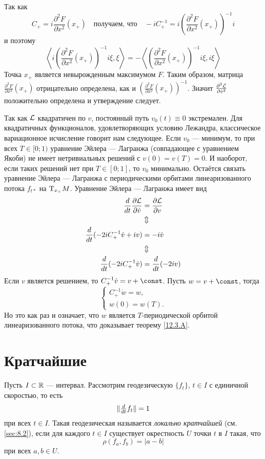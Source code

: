 Так как 
\[C_+=i\frac{\partial^2F}{\partial x^2}(x_+)
\quad\text{получаем, что}\quad
-iC_+^{-1}=i\left(\frac{\partial^2F}{\partial x^2}(x_+)\right)^{-1}i\]
и поэтому 
\[
\left\langle i\left(\frac{\partial^2F}{\partial x^2}(x_+)\right)^{-1}i\xi,\xi\right\rangle
=
-\left\langle \left(\frac{\partial^2F}{\partial x^2}(x_+)\right)^{-1}i\xi,i\xi\right\rangle
\]
Точка $x_+$ является невырожденным максимумом $F$.
Таким образом, матрица $\frac{\partial^2F}{\partial x^2}(x_+)$
отрицательно определена, как и $\left(\frac{\partial^2F}{\partial x^2}(x_+)\right)^{-1}$.
Значит $\tfrac{\partial^2\mathcal{L}}{\partial\dot v^2}$ положительно определена и утверждение следует.

Так как $\mathcal{L}$ квадратичен по $v$, постоянный путь $v_0(t) \equiv 0$ экстремален.
Для квадратичных функционалов, удовлетворяющих условию Лежандра, классическое вариационное исчисление говорит нам следующее.
Если $v_0$ — минимум, то при всех $T \in [0;1)$ уравнение Эйлера — Лагранжа (совпадающее с уравнением Якоби) не имеет нетривиальных решений с $v(0) = v(T) = 0$.
И наоборот, если таких решений нет при $T\in[0;1]$, то $v_0$ минимально.
Остаётся связать уравнение Эйлера — Лагранжа с периодическими орбитами линеаризованного потока $f_{t*}$ на $\mathrm{T}_{x_+}M$.
Уравнение Эйлера — Лагранжа имеет вид
\begin{align*}
\frac{d}{d t}\frac{\partial \mathcal{L}}{\partial \dot v}
&=\frac{\partial \mathcal{L}}{\partial v}
\\
&\Updownarrow
\\
\frac{d}{d t}(-2iC_+^{-1}\dot v+iv)
&=-i\dot v
\\
&\Updownarrow
\\
\frac{d}{d t}(-2iC_+^{-1}\dot v)
&=
\frac{d}{d t}(-2iv)
\end{align*}
Если $v$ является решением, то $C_+^{-1}\dot v = v + \const$.
Пусть $w = v + \const$, тогда 
\[
\begin{cases}
C_+^{-1}\dot w=w,
\\
w(0)=w(T).
\end{cases}
\]
Но это как раз и означает, что $w$ является $T$-периодической орбитой линеаризованного потока, что доказывает теорему \ref{12.3.A}.
\qeds


\section{Кратчайшие}
Пусть $I \subset \mathbb{R}$ — интервал.
Рассмотрим геодезическую $\{f_t\}$, $t\in I$ с единичной скоростью, то есть
\[\|\tfrac{d}{d t}f_t\|=1\]
при всех $t\in I$.
Такая геодезическая называется \emph{локально кратчайшей} %
(см. \ref{sec:8.2}), если для каждого $t\in I$ существует окрестность $U$ точки $t$ в $I$ такая, что  
\[\rho(f_a,f_b)=|a-b|\]
при всех $a,b\in U$.

